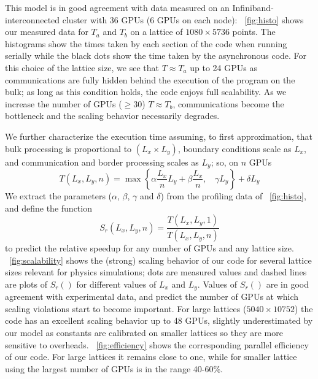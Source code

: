 \documentclass[times]{cpeauth}
\begin{document}
This model is in good agreement with data measured on an
Infiniband-interconnected  cluster with 36 GPUs (6 GPUs on each node): 
%
\figurename~\ref{fig:histo} shows our measured data for $T_a$ and $T_b$ on a 
lattice of $1080 \times 5736$ points. The histograms show 
the times taken by each section of the code when running serially while
the black dots show the time taken by the asynchronous code.   
%
For this choice of the lattice size, we see that $T \approx T_a$ up to 
24 GPUs as communications are fully hidden behind the
execution of the program on the bulk; as long as this condition holds, the
code enjoys full scalability. 
%
As we increase the number of GPUs ($\ge 30$) $T \approx T_b$, 
communications become the bottleneck and the scaling behavior necessarily degrades.

%
%

We further characterize the execution time assuming, to first approximation,   
that bulk processing is proportional to $(L_x \times L_y)$, boundary conditions scale 
as $L_x$, and communication and border processing scales as $L_y$; so, on $n$ GPUs
%
\[
 T(L_x, L_y, n) = \max \left\{ \alpha \frac{L_x}{n} L_y + \beta\frac{L_x}{n}, \:\:\:\: \gamma L_y \right\} + \delta L_y
\]
%
We extract the parameters ($\alpha$, $\beta$, $\gamma$ and $\delta$) from the 
profiling data of \figurename~\ref{fig:histo}, and define the function  
%
\begin{equation*}
  S_r(L_x,L_y,n) = \frac{T(L_x, L_y, 1)}{T(L_x, L_y, n)}
\end{equation*}
%
to predict the relative speedup for any number of GPUs and any lattice size. 
%
\figurename~\ref{fig:scalability} shows the (strong) scaling behavior of 
our code for several lattice sizes relevant for physics simulations; 
dots are measured values and dashed lines are plots of $S_r()$ 
for different values of $L_x$ and $L_y$.  
%
Values of $S_r()$ are in good agreement with experimental 
data, and predict the number of GPUs at which scaling violations start to become important.  
%
For large lattices ($5040 \times 10752$) the code has an excellent 
scaling behavior up to 48 GPUs, slightly underestimated by our model  
as constants are calibrated on smaller lattices so they are more sensitive 
to overheads.
%
\figurename~\ref{fig:efficiency} shows the corresponding parallel efficiency 
of our code. For large lattices it remains close to one, while for smaller 
lattice using the largest number of GPUs is in the range 40-60\%.
\end{document}
